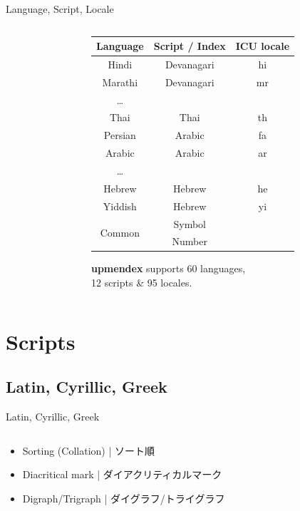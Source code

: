 \documentclass[aspectratio=169,10pt]{beamer}
\begin{document}
\begin{frame}[fragile]{Language, Script, Locale}
\begin{columns}
\begin{column}{70mm}
\begin{center}
\end{center}
\end{column}
\begin{column}{58mm}
\footnotesize
\begin{center}
\begin{tabular}{ccc}
  Language  & Script / Index & ICU locale \\\hline\hline
  Hindi     & Devanagari     & hi             \\
  Marathi   & Devanagari     & mr             \\
  \ldots    &                &                \\\hdashline
  Thai      & Thai           & th             \\\hline
  Persian   & Arabic         & fa             \\
  Arabic    & Arabic         & ar             \\
  \ldots    &                &                \\\hdashline
  Hebrew    & Hebrew         & he             \\
  Yiddish   & Hebrew         & yi             \\\hline
  \multirow{2}{*}{Common}  & Symbol   &       \\
            & Number         &                \\\hline
\end{tabular}
\end{center}
\vspace{2mm}
\textbf{upmendex} supports 60 languages,\\12 scripts \& 95 locales.
\end{column}
\end{columns}
\end{frame}


\section{Scripts}
\subsection{Latin, Cyrillic, Greek}
\begin{frame}{Latin, Cyrillic, Greek}
\begin{columns}
\begin{column}{120mm}
\begin{center}
\large
  \begin{itemize}
    \item Sorting (Collation) | ソート順
    \item Diacritical mark | ダイアクリティカルマーク
    \item Digraph/Trigraph | ダイグラフ/トライグラフ
  \end{itemize}
\end{center}
\end{column}
\end{columns}
\end{frame}
\end{document}
